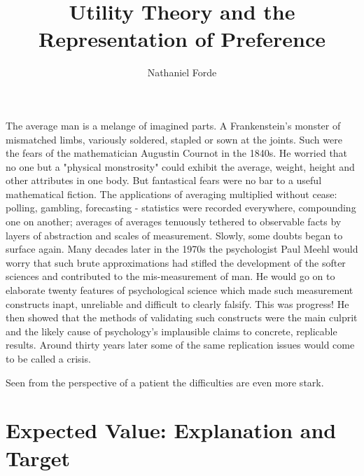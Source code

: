 \documentclass{tufte-handout}
\title{Utility Theory and the Representation of Preference}
\author[Nathaniel Forde]{Nathaniel Forde}
\begin{document}
\tableofcontents

\maketitle%


\noindent The average man is a melange of imagined parts. A Frankenstein's monster of mismatched limbs, variously soldered, stapled or sown at the joints. Such were the fears of the mathematician Augustin Cournot in the 1840s. He worried that no one but a "physical monstrosity" could exhibit the average, weight, height and other attributes in one body. But fantastical fears were no bar to a useful mathematical fiction. The applications of averaging multiplied without cease: polling, gambling, forecasting - statistics were recorded everywhere, compounding one on another; averages of averages tenuously tethered to observable facts by layers of abstraction and scales of measurement. Slowly, some doubts began to surface again. \cite{stigler2016seven} Many decades later in the 1970s the psychologist Paul Meehl would worry that such brute approximations had stifled the development of the softer sciences and contributed to the mis-measurement of man. He would go on to elaborate twenty features of psychological science which made such measurement constructs inapt, unreliable and difficult to clearly falsify. This was progress! \cite{MeehlTheoretical} He then showed that the methods of validating such constructs were the main culprit and the likely cause of psychology's implausible claims to concrete, replicable results. Around thirty years later some of the same replication issues would come to be called a crisis.
\linebreak

\noindent Seen from the perspective of a patient the difficulties are even more stark.

\section{\textbf{Expected Value: Explanation and Target}}
\label{sec:Expectations}
\end{document}
